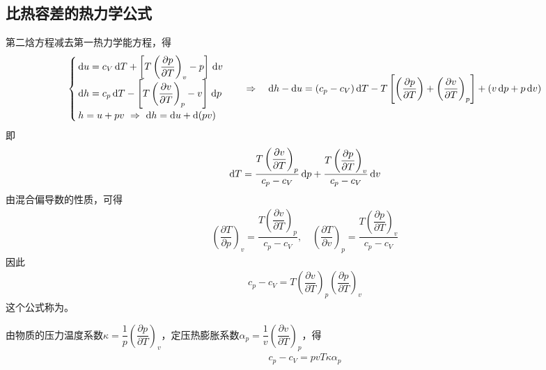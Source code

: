 \subsection{比热容差的热力学公式}
第二焓方程减去第一热力学能方程，得
\begin{align*}
	\begin{cases}
		\,{\rm{d}} u = c_V \,{\rm{d}} T + \left[T \left(\dfrac{\partial p}{\partial T}\right)_v - p \right]\,{\rm{d}} v\\
		\,{\rm{d}} h =c_p \, {\rm{d}} T - \left[T \left(\dfrac{\partial v}{\partial T}\right)_p - v\right]\, {\rm{d}} p \\
		\,h = u + pv \,\, \Rightarrow \,\, {\rm{d}} h = {\rm{d}} u +{\rm{d}}(pv)
	\end{cases}
	\quad \Rightarrow \quad
	{\rm{d}} h - {\rm{d}} u = (c_p -c_V)\, {\rm{d}} T - T \left[\left(\dfrac{\partial p}{\partial T}\right) + \left(\dfrac{\partial v}{\partial T}\right)_p \right] + (v\,{\rm{d}} p + p \, {\rm{d}} v)
\end{align*}
即
\begin{align}
	{\rm{d}} T = \dfrac{T \left(\dfrac{\partial v}{\partial T}\right)_p}{c_p - c_V}\, {\rm{d}} p +  \dfrac{T \left(\dfrac{\partial p}{\partial T}\right)_v}{c_p - c_V}\, {\rm{d}} v
\end{align}
由混合偏导数的性质，可得
\begin{align*}
	\left(\dfrac{\partial T}{\partial p}\right)_v = \dfrac{T \left(\dfrac{\partial v}{\partial T}\right)_p}{c_p - c_V}, \quad \left(\dfrac{\partial T}{\partial v}\right)_p = \dfrac{T \left(\dfrac{\partial p}{\partial T}\right)_v}{c_p - c_V}
\end{align*}
因此
\begin{align}
	c_p - c_V = T\left(\dfrac{\partial v}{\partial T}\right)_p\left(\dfrac{\partial p}{\partial T}\right)_v
\end{align}
这个公式称为。

由物质的压力温度系数$\displaystyle \kappa = \dfrac{1}{p} \left(\dfrac{\partial p}{\partial T}\right)_v$，定压热膨胀系数$\alpha_p = \dfrac{1}{v} \left(\dfrac{\partial v}{\partial T}\right)_p$，得
\begin{align}
	c_p - c_V = pvT \kappa \alpha_p
\end{align}

